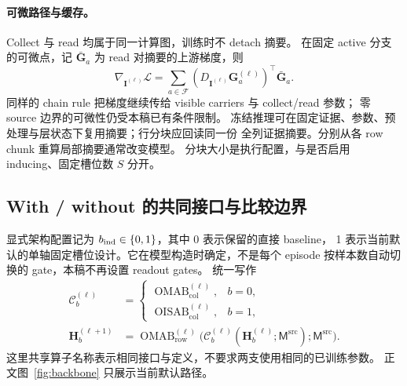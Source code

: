 \documentclass[11pt,UTF8,fontset=fandol]{ctexart}
\numberwithin{equation}{section}
\theoremstyle{definition}
\newcommand{\Fset}{\mathcal F}
\newcommand{\OMAB}{\operatorname{OMAB}}
\begin{document}
\paragraph{可微路径与缓存。}
Collect 与 read 均属于同一计算图，训练时不 detach 摘要。
在固定 active 分支的可微点，记 $\bar{\bm G}_a$ 为 read 对摘要的上游梯度，则
\begin{equation}
 \nabla_{\bm I^{(\ell)}}\mathcal L
 =\sum_{a\in\Fset}
   (D_{\bm I^{(\ell)}}\bm G_a^{(\ell)})^{\!\top}\bar{\bm G}_a.
 \label{eq:A:inducing-gradient}
\end{equation}
同样的 chain rule 把梯度继续传给 visible carriers 与 collect/read 参数；
零 source 边界的可微性仍受本稿已有条件限制。
冻结推理可在固定证据、参数、预处理与层状态下复用摘要；行分块应回读同一份
全列证据摘要。分别从各 row chunk 重算局部摘要通常改变模型。
分块大小是执行配置，与是否启用 inducing、固定槽位数 $S$ 分开。


\subsection{With / without 的共同接口与比较边界}
\label{subsec:A:backbone-comparison}

显式架构配置记为 $b_{\rm ind}\in\{0,1\}$，其中 0 表示保留的直接 baseline，
1 表示当前默认的单轴固定槽位设计。它在模型构造时确定，不是每个 episode
按样本数自动切换的 gate，本稿不再设置 readout gates。
统一写作
\begin{equation}
 \begin{aligned}
  \mathcal C_b^{(\ell)}&=
    \begin{cases}
      \OMAB_{\mathrm{col}}^{(\ell)},&b=0,\\
      \operatorname{OISAB}_{\mathrm{col}}^{(\ell)},&b=1,
    \end{cases}\\
  \bm H_b^{(\ell+1)}
    &=\OMAB_{\mathrm{row}}^{(\ell)}
       \bigl(\mathcal C_b^{(\ell)}
        (\bm H_b^{(\ell)};\mathsf M^{\mathrm{src}});\mathsf M^{\mathrm{src}}\bigr).
 \end{aligned}
 \label{eq:A:backbone-variants}
\end{equation}
这里共享算子名称表示相同接口与定义，不要求两支使用相同的已训练参数。
正文图~\ref{fig:backbone} 只展示当前默认路径。
\end{document}
